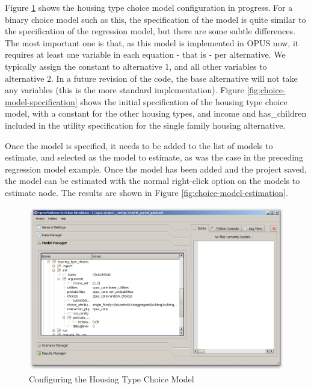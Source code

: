 Figure \ref{fig:configure-choice-model} shows the housing type choice model configuration in progress.  For a binary choice model such as this, the specification of the model is quite similar to the specification of the regression model, but there are some subtle differences.  The most important one is that, as this model is implemented in OPUS now, it requires at least one variable in each equation - that is - per alternative.  We typically assign the constant to alternative 1, and all other variables to alternative 2.  In a future revision of the code, the base alternative will not take any variables (this is the more standard implementation).  Figure \ref{fig:choice-model-specification} shows the initial specification of the housing type choice model, with a constant for the other housing types, and income and has\_children included in the utility specification for the single family housing alternative. 

Once the model is specified, it needs to be added to the list of models to estimate, and selected as the model to estimate, as was the case in the preceding regression model example.  Once the model has been added and the project saved, the model can be estimated with the normal right-click option on the models to estimate node.  The results are shown in Figure \ref{fig:choice-model-estimation}.

\begin{figure}[htp]
\begin{center}
\includegraphics[scale=0.35]{graphics/configure-choice-model.png}
\end{center}
\caption{Configuring the Housing Type Choice Model}
\label{fig:configure-choice-model}
\end{figure}

